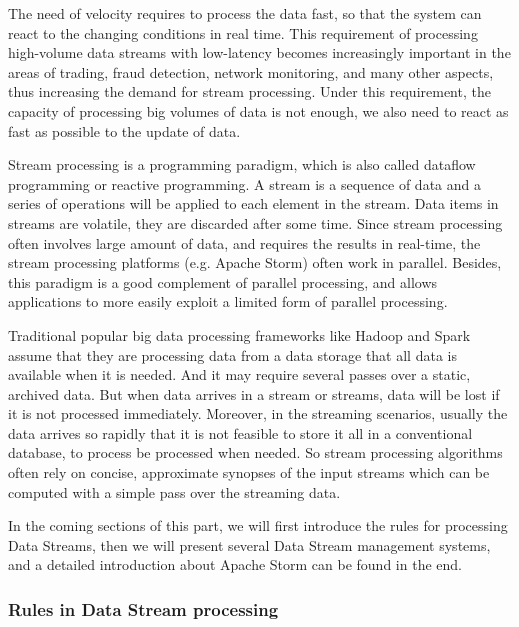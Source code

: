\documentclass[	DIV=calc,%
							paper=a4,%
							fontsize=11pt,%
							twocolumn]{scrartcl}	 					%
\begin{document}
The need of velocity requires to process the data fast, so that the system can react to the changing conditions in  real time. This requirement of processing high-volume data streams with low-latency becomes increasingly important in the areas of trading, fraud detection, network monitoring, and many other aspects, thus increasing the demand for stream processing. Under this requirement, the capacity of processing big volumes of data is not enough, we also need to react as fast as possible to the update of data.

Stream processing is a programming paradigm, which is also called dataflow programming or reactive programming. A stream is a sequence of data and a series of operations will be applied to each element in the stream. Data items in streams are volatile, they are discarded after some time. Since stream processing often involves large amount of data, and requires the results in real-time, the stream processing platforms (e.g. Apache Storm) often work in parallel. Besides, this paradigm is a good complement of parallel processing, and allows applications to more easily exploit a limited form of parallel processing.  

Traditional popular big data processing frameworks like Hadoop and Spark assume that they are processing data from a data storage that all data is available when it is needed. And it may require several passes over a static, archived data. But when data arrives in a stream or streams, data will be lost if it is not processed immediately. Moreover, in the streaming scenarios, usually the data arrives so rapidly that it is not feasible to store it all in a conventional database, to process be processed when needed. So stream processing algorithms often rely on concise, approximate synopses of the input streams which can be computed with a simple pass over the streaming data.

In the coming sections of this part, we will first introduce the rules for processing Data Streams, then we will present several Data Stream management systems, and a detailed introduction about Apache Storm can be found in the end.


\subsubsection*{Rules in Data Stream processing}
\end{document}
